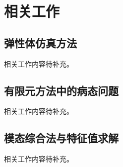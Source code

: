 
\section{相关工作}

\subsection{弹性体仿真方法}

相关工作内容待补充。

\subsection{有限元方法中的病态问题}

相关工作内容待补充。

\subsection{模态综合法与特征值求解}

相关工作内容待补充。
